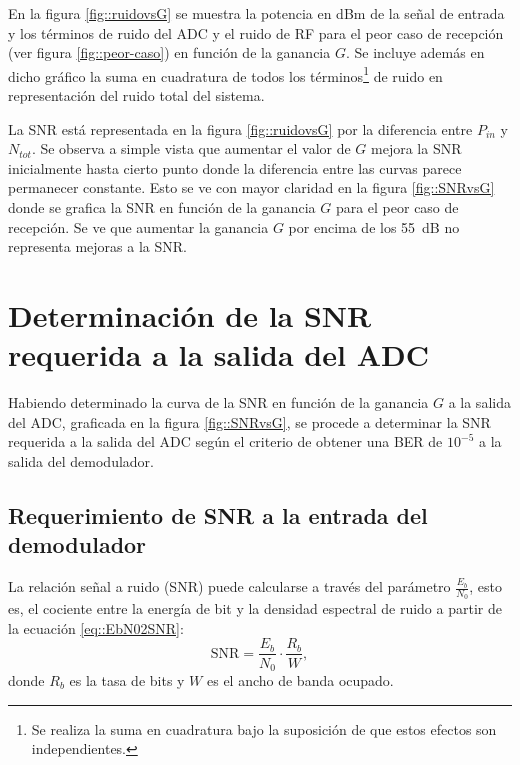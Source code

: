 \documentclass[../../main.tex]{subfiles}
\begin{document}
En la figura \ref{fig::ruidovsG} se muestra la potencia en dBm de la señal de entrada y los términos de ruido del ADC y el ruido de RF para el peor caso de recepción (ver figura \ref{fig::peor-caso}) en función de la ganancia $G$. Se incluye además en dicho gráfico la suma en cuadratura de todos los términos\footnote{Se realiza la suma en cuadratura bajo la suposición de que estos efectos son independientes.} de ruido en representación del ruido total del sistema.

La SNR está representada en la figura \ref{fig::ruidovsG} por la diferencia entre $P_{in}$ y $N_{tot}$. Se observa a simple vista que aumentar el valor de $G$ mejora la SNR inicialmente hasta cierto punto donde la diferencia entre las curvas parece permanecer constante. Esto se ve con mayor claridad en la figura \ref{fig::SNRvsG} donde se grafica la SNR en función de la ganancia $G$ para el peor caso de recepción. Se ve que aumentar la ganancia $G$ por encima de los 55~dB no representa mejoras a la SNR.



\section{Determinación de la SNR requerida a la salida del ADC}
Habiendo determinado la curva de la SNR en función de la ganancia $G$ a la salida del ADC, graficada en la figura \ref{fig::SNRvsG}, se procede a determinar la SNR requerida a la salida del ADC según el criterio de obtener una BER de $10^{-5}$ a la salida del demodulador.

\subsection{Requerimiento de SNR a la entrada del demodulador}
La relación señal a ruido (SNR) puede calcularse a través del parámetro $\frac{E_b}{N_0}$, esto es, el cociente entre la energía de bit y la densidad espectral de ruido a partir de la ecuación \ref{eq::EbN02SNR}:
\begin{equation}
    \textrm{SNR} = \frac{E_b}{N_0} \cdot \frac{R_b}{W},
    \label{eq::EbN02SNR}
\end{equation}
donde $R_b$ es la tasa de bits y $W$ es el ancho de banda ocupado.
\end{document}

